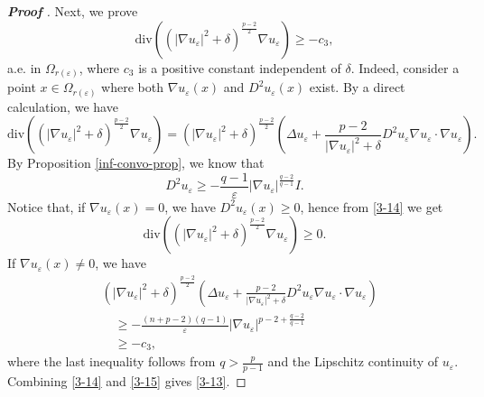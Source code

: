 \documentclass[12pt]{amsart}
\newcommand{\1}{\mathbf 1}
\begin{document}
\begin{proof}[\bf Proof ]
Next, we prove
\begin{equation}\label{3-13}
\mathrm{div} \left((|\nabla u_\varepsilon|^2+\delta)^{\frac{p-2}{2}} \nabla u_\varepsilon\right) \geq -c_3,
\end{equation}
a.e. in $\Omega_{r(\varepsilon)}$, where $c_3$ is a positive constant independent of $\delta$.
Indeed, consider a point $x\in \Omega_{r(\varepsilon)}$ where both $\nabla u_\varepsilon(x)$ and $D^2 u_\varepsilon(x)$ exist. By a direct calculation, we have
\begin{equation}\label{3-14}
\mathrm{div} \left((|\nabla u_\varepsilon|^2+\delta)^{\frac{p-2}{2}} \nabla u_\varepsilon\right)=(|\nabla u_\varepsilon|^2+\delta)^{\frac{p-2}{2}}\left( \Delta u_\varepsilon+\frac{p-2}{|\nabla u_\varepsilon|^2+\delta}D^2 u_\varepsilon \nabla u_\varepsilon \cdot \nabla u_\varepsilon \right).
\end{equation}
By Proposition \ref{inf-convo-prop}, we know that
\[
 D^2 u_\varepsilon \geq- \frac{q-1}{\varepsilon}|\nabla u_\varepsilon|^{\frac{q-2}{q-1}}I.
\]
Notice that, if $\nabla u_\varepsilon(x)=0$, we have $D^2 u_\varepsilon(x)\geq 0$, hence from  \eqref{3-14} we get
\begin{equation}\label{3-15}
\mathrm{div} \left((|\nabla u_\varepsilon|^2+\delta)^{\frac{p-2}{2}} \nabla u_\varepsilon\right)\geq 0.
\end{equation}
If $\nabla u_\varepsilon(x)\neq 0$, we have
\begin{align*}
 &(|\nabla u_\varepsilon|^2+\delta)^{\frac{p-2}{2}}\left( \Delta u_\varepsilon+\frac{p-2}{|\nabla u_\varepsilon|^2+\delta}D^2 u_\varepsilon \nabla u_\varepsilon \cdot \nabla u_\varepsilon \right)\\
 &\quad \geq-\frac{(n+p-2)(q-1)}{\varepsilon} |\nabla u_\varepsilon|^{p-2+\frac{q-2}{q-1}}\\
 &\quad \geq-c_3,
\end{align*}
where the last inequality follows from $q>\frac{p}{p-1}$ and the Lipschitz continuity of $u_\varepsilon$. Combining \eqref{3-14} and  \eqref{3-15} gives \eqref{3-13}.


\end{proof}
\end{document}

